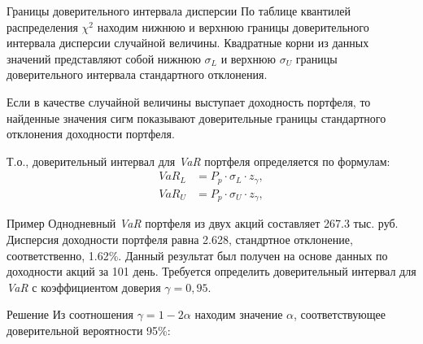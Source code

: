 \documentclass[financial_risks_lectures.tex]{subfiles}
\begin{document}
\begin{frame}{Границы доверительного интервала дисперсии}
По таблице квантилей распределения $\chi^2$ находим нижнюю и верхнюю границы доверительного интервала дисперсии случайной величины. Квадратные корни из данных значений представляют собой нижнюю $\sigma_L$  и верхнюю $\sigma_U$ границы доверительного интервала стандартного отклонения.

Если в качестве случайной величины выступает доходность портфеля, то найденные значения сигм показывают доверительные границы стандартного отклонения доходности портфеля.

Т.о., доверительный интервал для \textit{VaR} портфеля определяется по формулам:
\begin{align}
VaR_L &=P_p \cdot \sigma_L \cdot z_{\gamma},\\
VaR_U &=P_p \cdot \sigma_U \cdot z_{\gamma},
\end{align}

\end{frame}

\begin{frame}
\begin{exampleblock}{Пример}
Однодневный \textit{VaR }портфеля из двух акций составляет 267.3 тыс. руб. Дисперсия доходности портфеля равна 2.628, стандртное отклонение, соответственно, 1.62\%. Данный результат был получен на основе данных по доходности акций за 101 день. Требуется определить доверительный интервал для \textit{VaR }с коэффициентом доверия $\gamma = 0,95$.
\end{exampleblock}
\end{frame}
\begin{frame}[shrink=10]
\begin{exampleblock}{Решение}
Из соотношения $\gamma=1-2\alpha$ находим значение $\alpha$, соответствующее доверительной вероятности 95\%:

\end{exampleblock}
\end{frame}
\end{document}
